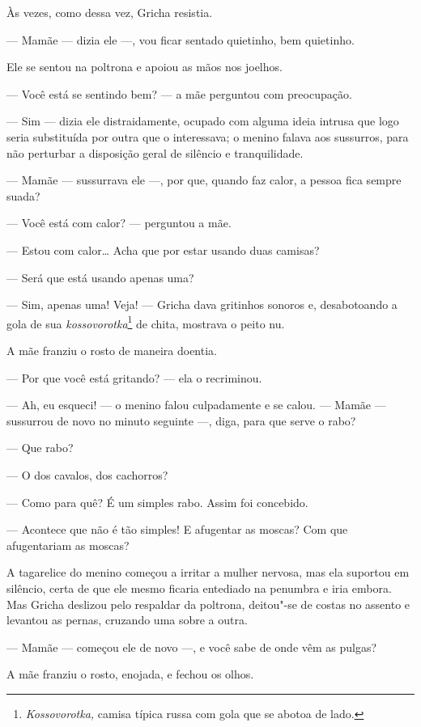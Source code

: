 Às vezes, como dessa vez, Gricha resistia.

--- Mamãe --- dizia ele ---, vou ficar sentado quietinho, bem quietinho.

Ele se sentou na poltrona e apoiou as mãos nos joelhos.

--- Você está se sentindo bem? --- a mãe perguntou com preocupação.

--- Sim --- dizia ele distraidamente, ocupado com alguma ideia intrusa
que logo seria substituída por outra que o interessava; o menino falava
aos sussurros, para não perturbar a disposição geral de silêncio e
tranquilidade.

--- Mamãe --- sussurrava ele ---, por que, quando faz calor, a pessoa
fica sempre suada?

--- Você está com calor? --- perguntou a mãe.

--- Estou com calor\ldots{} Acha que por estar usando duas camisas?

--- Será que está usando apenas uma?

--- Sim, apenas uma! Veja! --- Gricha dava gritinhos sonoros e,
desabotoando a gola de sua \emph{kossovorotka}\footnote{\emph{Kossovorotka,}
  camisa típica russa com gola que se abotoa de lado.} de chita,
mostrava o peito nu.

A mãe franziu o rosto de maneira doentia.

--- Por que você está gritando? --- ela o recriminou.

--- Ah, eu esqueci! --- o menino falou culpadamente e se calou. ---
Mamãe --- sussurrou de novo no minuto seguinte ---, diga, para que serve
o rabo?

--- Que rabo?

--- O dos cavalos, dos cachorros?

--- Como para quê? É um simples rabo. Assim foi concebido.

--- Acontece que não é tão simples! E afugentar as moscas? Com que
afugentariam as moscas?

A tagarelice do menino começou a irritar a mulher nervosa, mas ela
suportou em silêncio, certa de que ele mesmo ficaria entediado na
penumbra e iria embora. Mas Gricha deslizou pelo respaldar da poltrona,
deitou"-se de costas no assento e levantou as pernas, cruzando uma sobre
a outra.

--- Mamãe --- começou ele de novo ---, e você sabe de onde vêm as
pulgas?

A mãe franziu o rosto, enojada, e fechou os olhos.

